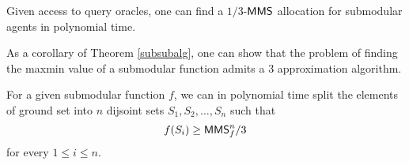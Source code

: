 \begin{theorem}\label{subsubalg}
	Given access to query oracles, one can find a $1/3$-$\mathsf{MMS}$ allocation for submodular agents in polynomial time.
\end{theorem}

As a corollary of Theorem \ref{subsubalg}, one can show that the problem of finding the maxmin value of a submodular function admits a 3 approximation algorithm.

\begin{corollary}
	For a given submodular function $f$, we can in polynomial time split the elements of ground set into $n$ dijsoint sets $S_1, S_2, \ldots, S_n$ such that 
	$$f(S_i) \geq \mathsf{MMS}_f^n/3$$
	for every $1 \leq i \leq n$.
\end{corollary}